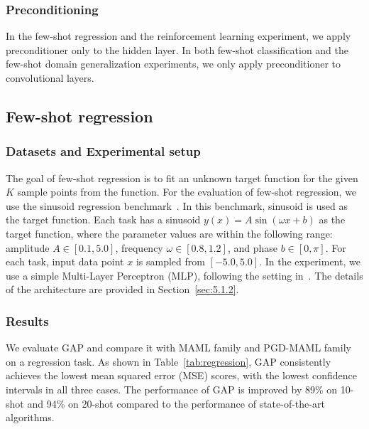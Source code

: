 \subsubsection{Preconditioning}
In the few-shot regression and the reinforcement learning experiment, we apply preconditioner only to the hidden layer. In both few-shot classification and the few-shot domain generalization experiments, we only apply preconditioner to convolutional layers.

\subsection{Few-shot regression}
\subsubsection{Datasets and Experimental setup}
The goal of few-shot regression is to fit an unknown target function for the given $K$ sample points from the function.
For the evaluation of few-shot regression, we use the sinusoid regression benchmark~\cite{finn2017model}.
In this benchmark, sinusoid is used as the target function. Each task has a sinusoid $y(x)=A\sin(\omega x + b)$ as the target function, where the parameter values are within the following range: amplitude $A\in\left[0.1, 5.0\right]$, frequency $\omega\in\left[0.8, 1.2\right]$, and phase $b\in\left[0, \pi\right]$. For each task, input data point $x$ is sampled from $\left[-5.0, 5.0\right]$. 
In the experiment, we use a simple Multi-Layer Perceptron (MLP), following the setting in~\cite{finn2017model}. 
The details of the architecture are provided in Section~\ref{sec:5.1.2}.

\subsubsection{Results}
We evaluate GAP and compare it with MAML family and PGD-MAML family on a regression task. As shown in Table~\ref{tab:regression}, GAP consistently achieves the lowest mean squared error (MSE) scores, with the lowest confidence intervals in all three cases. The performance of GAP is improved by 89\% on 10-shot and 94\% on 20-shot compared to the performance of state-of-the-art algorithms.

